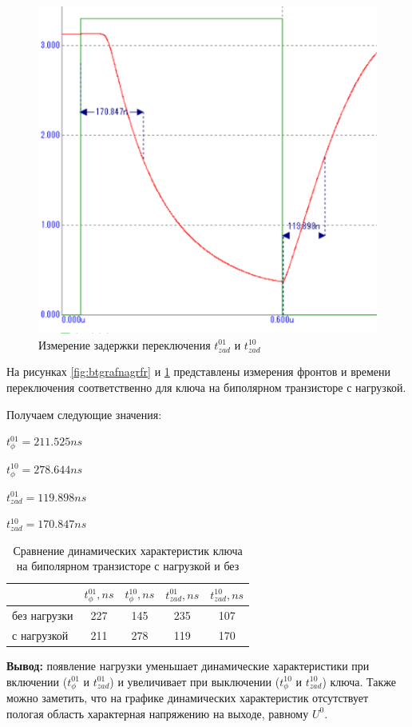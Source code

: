 \documentclass[a4paper,14pt]{article}
\begin{document}
\begin{figure}[H]
	\centering
	\includegraphics[width=0.4\linewidth]{image/BT_graf_nagr_zad}
	\caption{Измерение задержки переключения $t^{01}_{zad}$ и $t^{10}_{zad}$}
	\label{fig:btgrafnagrzad}
\end{figure}


На рисунках \ref{fig:btgrafnagrfr} и \ref{fig:btgrafnagrzad} представлены измерения фронтов и времени переключения соответственно для ключа на биполярном транзисторе с нагрузкой. 

Получаем следующие значения:

$t^{01}_{\phi} = 211.525ns$

$t^{10}_{\phi} = 278.644ns$

$t^{01}_{zad} = 119.898ns$

$t^{10}_{zad} = 170.847ns$

\begin{table}[H]
	\caption{Сравнение динамических характеристик ключа на биполярном транзисторе с нагрузкой и без}
	\centering
	\begin{tabular}{|l|c|c|c|c|}
		\hline
		& $t^{01}_{\phi}, ns$ & $t^{10}_{\phi}, ns$ & $t^{01}_{zad}, ns$ & $t^{10}_{zad}, ns$ \\ \hline
		без нагрузки & 227 & 145 & 235 & 107 \\ \hline
		с нагрузкой & 211 & 278 & 119 & 170 \\ \hline
	\end{tabular}

\label{tab:sr_har}
\end{table}


\textbf{Вывод: } появление нагрузки уменьшает динамические характеристики при включении ($t^{01}_{\phi}$ и $t^{01}_{zad}$) и увеличивает при выключении ($t^{10}_{\phi}$ и $t^{10}_{zad}$) ключа. Также можно заметить, что на графике динамических характеристик отсутствует пологая область характерная напряжению на выходе, равному $U^0$.
\end{document}

